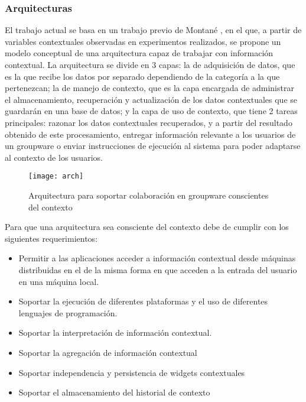 \subsubsection{Arquitecturas}

El trabajo actual se basa en un trabajo previo de Montan\'e \cite{montane2013context}, en el que, a partir de variables contextuales observadas en experimentos realizados, se propone un modelo conceptual de una arquitectura capaz de trabajar con informaci\'on contextual. La arquitectura se divide en 3 capas: la de adquisici\'on de datos, que es la que recibe los datos por separado dependiendo de la categor\'ia a la que pertenezcan; la de manejo de contexto, que es la capa encargada de administrar el almacenamiento, recuperaci\'on y actualizaci\'on de los datos contextuales que se guardar\'an en una base de datos; y la capa de uso de contexto, que tiene 2 tareas principales: razonar los datos contextuales recuperados, y a partir del resultado obtenido de este procesamiento, entregar informaci\'on relevante a los usuarios de un groupware o enviar instrucciones de ejecuci\'on al sistema para poder adaptarse al contexto de los usuarios.

\begin{figure}[h!]
  \centering
  \texttt{[image: arch]}
  \caption{Arquitectura para soportar colaboraci\'on en groupware conscientes del contexto \cite{montane2013context}}
\end{figure}

Para que una arquitectura sea consciente del contexto debe de cumplir con los siguientes requerimientos\cite{dey1999architecture}:
\begin{itemize}
\item Permitir a las aplicaciones acceder a informaci\'on contextual desde m\'aquinas distribuidas en el de la misma forma en que acceden a la entrada del usuario en una m\'aquina local.
\item Soportar la ejecuci\'on de diferentes plataformas y el uso de diferentes lenguajes de programaci\'on.
\item Soportar la interpretaci\'on de informaci\'on contextual.
\item Soportar la agregaci\'on de informaci\'on contextual
\item Soportar independencia y persistencia de widgets contextuales
\item Soportar el almacenamiento del historial de contexto
\end{itemize}

